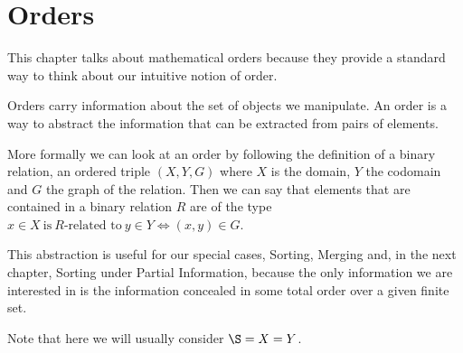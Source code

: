 \section{Orders}

This chapter talks about mathematical orders because they provide a standard
way to think about our intuitive notion of order.

Orders carry information about the set of objects we manipulate. An order is a
way to abstract the information that can be extracted from pairs of elements.

More formally we can look at an order by following the definition of a binary
relation, an ordered triple $(X, Y, G)$ where $X$ is the domain, $Y$ the
codomain and $G$ the graph of the relation.
Then we can say that elements that are contained in a binary relation $R$ are
of the type $x \in X~\text{is}~R\text{-related to}~y \in Y \iff (x, y) \in G$.

This abstraction is useful for our special cases, \ie Sorting, Merging and, in
the next chapter, Sorting under Partial Information, because the only
information we are interested in is the information concealed in some total
order over a given finite set.

Note that here we will usually consider \(\S = X = Y\).

